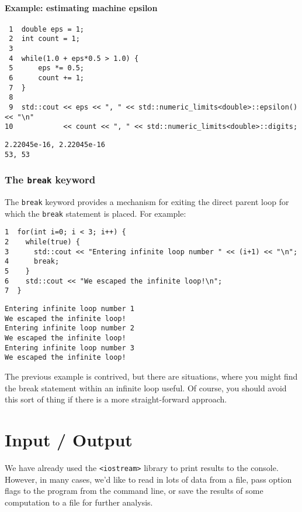 \documentclass[11pt]{article}
\begin{document}
\paragraph{Example: estimating machine epsilon}
\label{sec:orgheadline30}

\begin{verbatim}
 1  double eps = 1;
 2  int count = 1;
 3  
 4  while(1.0 + eps*0.5 > 1.0) {
 5      eps *= 0.5;
 6      count += 1;
 7  }
 8  
 9  std::cout << eps << ", " << std::numeric_limits<double>::epsilon() << "\n"
10            << count << ", " << std::numeric_limits<double>::digits;
\end{verbatim}

\begin{verbatim}
2.22045e-16, 2.22045e-16
53, 53
\end{verbatim}

\subsubsection{The \texttt{break} keyword}
\label{sec:orgheadline32}
The \texttt{break} keyword provides a mechanism for exiting the direct parent loop
for which the \texttt{break} statement is placed. For example:

\begin{verbatim}
1  for(int i=0; i < 3; i++) {
2    while(true) {
3      std::cout << "Entering infinite loop number " << (i+1) << "\n";
4      break;
5    }
6    std::cout << "We escaped the infinite loop!\n";
7  }
\end{verbatim}

\begin{verbatim}
Entering infinite loop number 1
We escaped the infinite loop!
Entering infinite loop number 2
We escaped the infinite loop!
Entering infinite loop number 3
We escaped the infinite loop!
\end{verbatim}

The previous example is contrived, but there are situations, where you
might find the break statement within an infinite loop useful. Of course,
you should avoid this sort of thing if there is a more straight-forward 
approach.

\section{Input / Output}
\label{sec:orgheadline39}
We have already used the \texttt{<iostream>} library to print results to 
the console. However, in many cases, we'd like to read in lots of 
data from a file, pass option flags to the program from the command 
line, or save the results of some computation to a file for further 
analysis.
\end{document}
